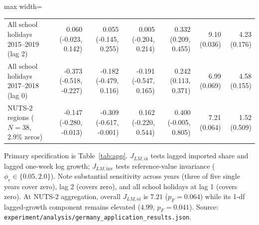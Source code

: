 \begin{table}[!t]
\begin{adjustbox}{max width=\linewidth}
\begin{tabular}{lrrrrrr}
All school holidays 2015--2019 (lag 2) & 0.060 (-0.023, 0.142) & 0.055 (-0.145, 0.255) & 0.005 (-0.204, 0.214) & 0.332 (0.209, 0.455) & 9.10 (0.036) & 4.23 (0.176) \\
All school holidays 2017--2018 (lag 0) & -0.373 (-0.518, -0.227) & -0.182 (-0.479, 0.116) & -0.191 (-0.547, 0.165) & 0.242 (0.113, 0.371) & 6.99 (0.069) & 4.58 (0.155) \\
NUTS-2 regions ($N=38$, 2.9\% zeros) & -0.147 (-0.280, -0.013) & -0.309 (-0.617, -0.001) & 0.162 (-0.220, 0.544) & 0.400 (-0.005, 0.805) & 7.21 (0.064) & 1.52 (0.509) \\
\bottomrule
\end{tabular}
\end{adjustbox}
\par\smallskip\parbox{\linewidth}{\scriptsize Primary specification is Table~\ref{tab:app}. $J_{LM,\mathrm{oi}}$ tests lagged imported share and lagged one-week log growth; $J_{LM,\mathrm{inv}}$ tests reference-value invariance ($\phi_r \in \{0.05, 2.0\}$). Note substantial sensitivity across years (three of five single years cover zero), lag 2 (covers zero), and all school holidays at lag 1 (covers zero). At NUTS-2 aggregation, overall $J_{LM,\mathrm{oi}}$ is $7.21$ ($p_F=0.064$) while its 1-df lagged-growth component remains elevated ($4.99$, $p_F=0.041$). Source: \texttt{experiment/analysis/germany\_application\_results.json}.}
\end{table}
